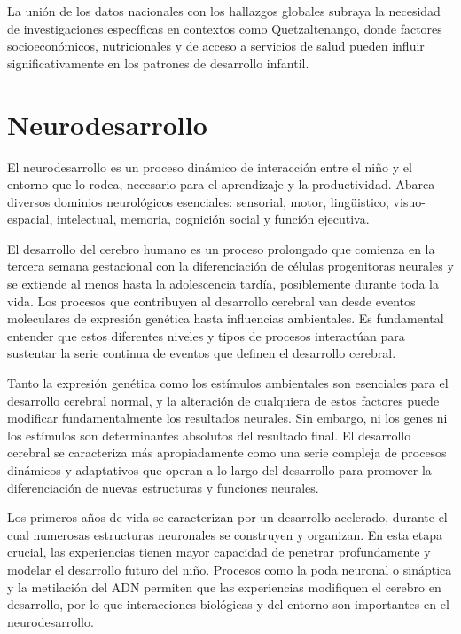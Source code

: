 \documentclass[11pt,letterpaper]{report}
\begin{document}
La unión de los datos nacionales con los hallazgos globales subraya la 
necesidad de investigaciones específicas en contextos como Quetzaltenango, 
donde factores socioeconómicos, nutricionales y de acceso a servicios de salud 
pueden influir significativamente en los patrones de desarrollo infantil.

\section{Neurodesarrollo}
El neurodesarrollo es un proceso dinámico de interacción entre el niño y el 
entorno que lo rodea, necesario para el aprendizaje y la productividad. Abarca
diversos dominios neurológicos esenciales: sensorial, motor, lingüistico,
visuo-espacial, intelectual, memoria, cognición social y función ejecutiva.
\cite{Nelson46}

El desarrollo del cerebro humano es un proceso prolongado que comienza en la 
tercera semana gestacional con la diferenciación de células progenitoras 
neurales y se extiende al menos hasta la adolescencia tardía, posiblemente 
durante toda la vida. Los procesos que contribuyen al desarrollo cerebral van 
desde eventos moleculares de expresión genética hasta influencias ambientales. 
Es fundamental entender que estos diferentes niveles y tipos de procesos 
interactúan para sustentar la serie continua de eventos que definen el 
desarrollo cerebral.
\cite{Stiles2010}

Tanto la expresión genética como los estímulos ambientales son esenciales para 
el desarrollo cerebral normal, y la alteración de cualquiera de estos factores 
puede modificar fundamentalmente los resultados neurales. Sin embargo, ni los 
genes ni los estímulos son determinantes absolutos del resultado final. El
desarrollo cerebral se caracteriza más apropiadamente como una serie compleja
de procesos dinámicos y adaptativos que operan a lo largo del desarrollo para
promover la diferenciación de nuevas estructuras y funciones neurales.
\cite{Stiles2010}

Los primeros años de vida se caracterizan por un desarrollo acelerado, durante
el cual numerosas estructuras neuronales se construyen y organizan. En esta
etapa crucial, las experiencias tienen mayor capacidad de penetrar
profundamente y modelar el desarrollo futuro del niño. Procesos como la poda
neuronal o sináptica y la metilación del ADN permiten que las experiencias
modifiquen el cerebro en desarrollo, por lo que interacciones biológicas y del
entorno son importantes en el neurodesarrollo. \cite{Feldman2}
\end{document}
